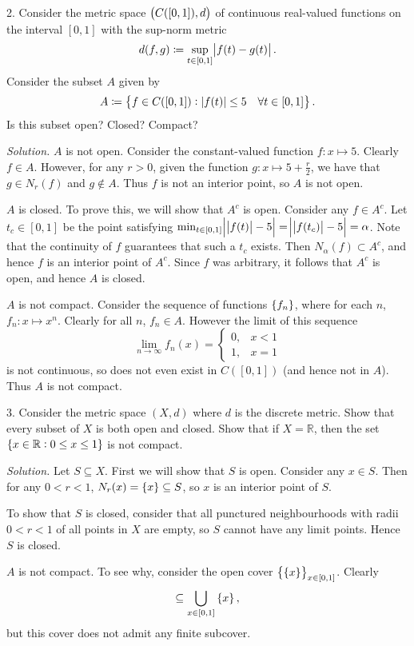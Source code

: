 \documentclass{article}
\newcommand{\R}{\mathbb{R}}
\begin{document}
\newpage

2. Consider the metric space $\del{C([0, 1]), d}$ of continuous real-valued
   functions on the interval $[0, 1]$ with the sup-norm metric
%
\begin{equation*}
    d(f, g) \coloneqq \sup_{t \in [0, 1]} \envert{f(t) - g(t)}
    .
\end{equation*}
%
Consider the subset $A$ given by
%
\begin{equation*}
    A \coloneqq \cbr{f \in C([0, 1]): |f(t)| \leq 5 \quad \forall t \in [0, 1]}
    .
\end{equation*}
%
Is this subset open? Closed? Compact?

\textit{Solution.}
$A$ is not open. Consider the constant-valued function $f: x \mapsto 5$.
Clearly $f \in A$. However, for any $r > 0$, given the function $g: x
\mapsto 5 + \frac{r}{2}$, we have that $g \in N_r(f)$ and $g \not\in A$.
Thus $f$ is not an interior point, so $A$ is not open.

$A$ is closed. To prove this, we will show that $A^c$ is open. Consider
any $f \in A^c$. Let $t_c \in [0, 1]$ be the point satisfying $\min_{t
\in [0, 1]} \envert{\,\envert{f(t)} - 5} = \envert{\,\envert{f(t_c)} -
5} = \alpha$. Note that the continuity of $f$ guarantees that such a
$t_c$ exists. Then $N_\alpha (f) \subset A^c$, and hence $f$ is an
interior point of $A^c$. Since $f$ was arbitrary, it follows that $A^c$
is open, and hence $A$ is closed.

$A$ is not compact. Consider the sequence of functions $\cbr{f_n}$,
where for each $n$, $f_n: x \mapsto x^n$. Clearly for all $n$, $f_n \in
A$. However the limit of this sequence
%
\begin{equation*}
    \lim_{n \to \infty} f_n(x) = \begin{cases}
        0, & x < 1 \\
        1, & x = 1
    \end{cases}
\end{equation*}
%
is not continuous, so does not even exist in $C([0, 1])$ (and hence not
in $A$). Thus $A$ is not compact.

\newpage

3. Consider the metric space $(X, d)$ where $d$ is the discrete metric.
   Show that every subset of $X$ is both open and closed. Show that if
   $X = \R$, then the set $\cbr{x \in \R: 0 \leq x \leq 1}$ is not
   compact.

\textit{Solution.}
Let $S \subseteq X$. First we will show that $S$ is open. Consider any $x
\in S$. Then for any $0 < r < 1$, $N_r(x) = \cbr{x} \subseteq S$, so $x$
is an interior point of $S$.

To show that $S$ is closed, consider that all punctured neighbourhoods
with radii $0 < r < 1$ of all points in $X$ are empty, so $S$ cannot
have any limit points. Hence $S$ is closed.

$A$ is not compact. To see why, consider the open cover
$\cbr{\cbr{x}}_{x \in [0, 1]}$. Clearly
%
\begin{equation*}
    [0, 1] \subseteq \bigcup_{x \in [0, 1]} \cbr{x}
    ,
\end{equation*}
%
but this cover does not admit any finite subcover.
\end{document}
